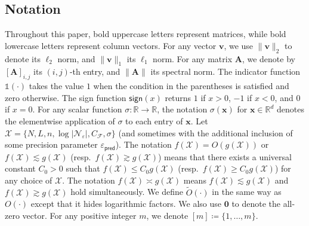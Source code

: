 \documentclass[english]{article}
\begin{document}













\subsection{Notation}
\label{subsec:notations}

Throughout this paper, bold uppercase letters represent matrices, while bold lowercase letters represent column vectors. For any vector $\bm{v}$, 
we use $\|{\bm v}\|_2$ to denote its $\ell_2$ norm, and $\|{\bm v}\|_1$ its $\ell_1$ norm.
For any matrix $\bm{A}$, we denote by $[{\bm A}]_{i,j}$ its $(i,j)$-th entry, and $\|{\bm A}\|$ its spectral norm.
The indicator function $\mathds{1}(\cdot)$ takes the value $1$ when the condition in the parentheses is satisfied and zero otherwise.
The sign function $\mathsf{sign}(x)$ returns $1$ if $x>0$, $-1$ if $x<0$, and $0$ if $x=0$.
For any scalar function $\sigma:\mathbb{R}\to\mathbb{R}$, the notation $\sigma({\bm x})$ for ${\bm x}\in\mathbb{R}^d$ denotes the elementwise application of $\sigma$ to each entry of ${\bm x}$.
Let $\mathcal{X} = \{N,L,n,\log|\mathcal{N}_\varepsilon|,C_{\mathcal{F}},\sigma\}$ (and sometimes with the additional inclusion of some precision parameter $\varepsilon_{\mathsf{pred}}$).
The notation $f(\mathcal{X}) = O(g(\mathcal{X}))$ or $f(\mathcal{X}) \lesssim g(\mathcal{X})$ (resp.~$f(\mathcal{X}) \gtrsim g(\mathcal{X})$) means that there exists a universal constant $C_0> 0$ such that $f(\mathcal{X}) \le C_0 g(\mathcal{X})$ (resp.~$f(\mathcal{X}) \ge C_0 g(\mathcal{X})$) for any choice of $\mathcal{X}$. 
The notation $f(\mathcal{X})\asymp g(\mathcal{X})$ means $f(\mathcal{X}) \lesssim g(\mathcal{X})$ and $f(\mathcal{X}) \gtrsim g(\mathcal{X})$ hold simultaneously. 
We define $\widetilde{O}(\cdot)$ in the same way as $O(\cdot)$ except that it hides logarithmic factors. 
We also use $\bm{0}$  to denote the all-zero vector. For any positive integer $m$, we denote $[m]\coloneqq  \{1,\dots,m\}$.  
\end{document}

